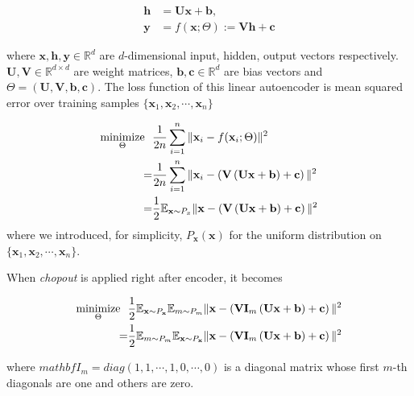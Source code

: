 \documentclass{article}
\newcommand{\minimize}{\mathop{\rm minimize}\limits}
\begin{document}
    \begin{align}
        \mathbf{h} &= \mathbf{U} \mathbf{x} + \mathbf{b}, \nonumber \\
        \mathbf{y} &= f(\mathbf{x}; \Theta) := \mathbf{V} \mathbf{h} + \mathbf{c} \nonumber
    \end{align}
    
    where $\mathbf{x},\mathbf{h}, \mathbf{y} \in \mathbb{R}^d$ are $d$-dimensional input, hidden, output vectors respectively. $\mathbf{U}, \mathbf{V} \in \mathbb{R}^{d \times d}$ are weight matrices, $\mathbf{b}, \mathbf{c} \in \mathbb{R}^d$ are bias vectors and $\Theta = (\mathbf{U}, \mathbf{V}, \mathbf{b}, \mathbf{c})$. The loss function of this linear autoencoder is mean squared error over training samples $\{\mathbf{x}_1, \mathbf{x}_2, \cdots, \mathbf{x}_n\}$
    
    \begin{align}
        \minimize_{\Theta} \ \  
        &\frac{1}{2n} \sum_{i=1}^n \Vert \mathbf{x}_i - f(\mathbf{x}_i; \Theta) \Vert^2 \nonumber \\
        =& \frac{1}{2n} \sum_{i=1}^n \Vert \mathbf{x}_i - \left( \mathbf{V} \left( \mathbf{U} \mathbf{x} + \mathbf{b} \right) + \mathbf{c} \right) \Vert^2 \nonumber \\
        =& \frac{1}{2} \mathbb{E}_{\mathbf{x} \sim P_x} \Vert \mathbf{x} - \left( \mathbf{V} \left( \mathbf{U} \mathbf{x} + \mathbf{b} \right) + \mathbf{c} \right) \Vert^2 
    \end{align}
    where we introduced, for simplicity, $P_\mathbf{x}(\mathbf{x})$ for the uniform distribution on $\{\mathbf{x}_1, \mathbf{x}_2, \cdots, \mathbf{x}_n\}$.
    
    When \textit{chopout} is applied right after encoder, it becomes
    
    \begin{align}
        \minimize_{\Theta} \ \ 
         &\frac{1}{2} \mathbb{E}_{\mathbf{x} \sim P_\mathbf{x}} \mathbb{E}_{m \sim P_m} \Vert \mathbf{x} - \left( \mathbf{V} \mathbf{I}_m \left( \mathbf{U} \mathbf{x} + \mathbf{b} \right) + \mathbf{c} \right) \Vert^2 \nonumber \\
         =& \frac{1}{2} \mathbb{E}_{m \sim P_m} \mathbb{E}_{\mathbf{x} \sim P_\mathbf{x}} \Vert \mathbf{x} - \left( \mathbf{V} \mathbf{I}_m \left( \mathbf{U} \mathbf{x} + \mathbf{b} \right) + \mathbf{c} \right) \Vert^2
    \end{align}    
    
    where $mathbf{I}_m = diag(1, 1, \cdots, 1, 0, \cdots, 0)$ is a diagonal matrix whose first $m$-th diagonals are one and others are zero. 
\end{document}
